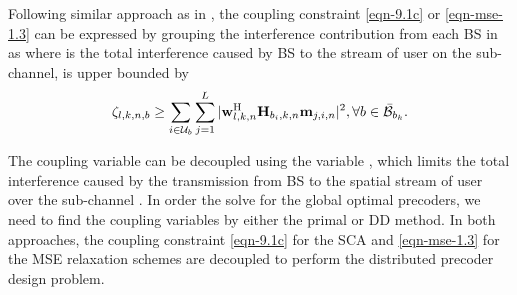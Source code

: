 Following similar approach as in \cite{pennanen2011decentralized,tolli2011decentralized}, the coupling constraint \eqref{eqn-9.1c} or \eqref{eqn-mse-1.3} can be expressed by grouping the interference contribution from each \ac{BS} in  as
\iftoggle{single_column}{
\begin{IEEEeqnarray}{rCl}\label{eqn-decent-3}
\beta_{l,k,n} & \geq & \sum_{\substack{j = 1\\j \neq l}}^L |\mvec{w}{l,k,n}^\herm \mvec{H}{b_k,k,n} \mvec{m}{j,k,n} |^2 \nonumber \\
&\quad& + \sum_{i \in \mc{U}_{b_k} \backslash \{k\}} \sum_{j = 1}^L |\mvec{w}{l,k,n}^\herm \mvec{H}{b_k,k,n} \mvec{m}{j,i,n} |^2 + \sum_{b \in \bar{\mc{B}}_{b_k}} \zeta_{l,k,n,b} \; + \; N_0\|\mvec{w}{l,k,n}\|^2,
\end{IEEEeqnarray}}{\allowdisplaybreaks
\begin{multline}\label{eqn-decent-3}
	N_0\|\mvec{w}{l,k,n}\|^2 + \sum_{\substack{j = 1,j \neq l}}^L |\mvec{w}{l,k,n}^\herm \mvec{H}{b_k,k,n} \mvec{m}{j,k,n} |^2 + \sum_{b \in \bar{\mc{B}}_{b_k}} \zeta_{l,k,n,b}  \\
	+ \sum_{i \in \mc{U}_{b_k} \backslash \{k\}} \sum_{j = 1}^L |\mvec{w}{l,k,n}^\herm \mvec{H}{b_k,k,n} \mvec{m}{j,i,n} |^2 \leq \beta_{l,k,n},
\end{multline}}
where  is the total interference caused by \ac{BS}  to the  stream of user  on the  sub-channel, is upper bounded by
\begin{equation}
\zeta_{l,k,n,b} \geq \sum_{i \in \mathcal{U}_b} \sum_{j = 1}^L |\mathbf{w}_{l,k,n}^{\mathrm{H}} \mathbf{H}_{b_i,k,n} \mathbf{m}_{j,i,n} |^2, \forall b \in \bar{\mathcal{B}}_{b_k}.
\end{equation}

The coupling variable  can be decoupled using the variable , which limits the total interference caused by the transmission from \ac{BS}  to the  spatial stream of user  over the sub-channel . In order the solve for the global optimal precoders, we need to find the coupling variables  by either the primal or \acl{DD} method. In both approaches, the coupling constraint \eqref{eqn-9.1c} for the \ac{SCA} and \eqref{eqn-mse-1.3} for the \ac{MSE} relaxation schemes are decoupled to perform the distributed precoder design problem. 